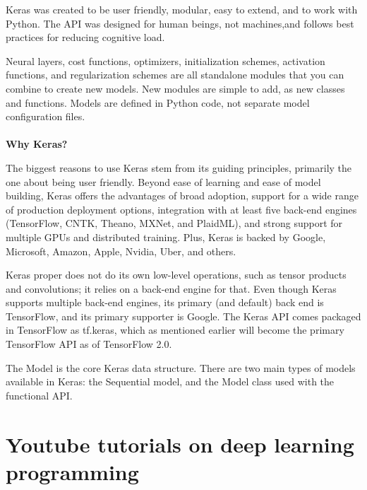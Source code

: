 \documentclass[11pt]{article}
\begin{document}
\begin{enumerate}
Keras was created to be user friendly, modular, easy to extend, and to work with Python. The API was \textquotesingle designed for human beings, not machines,\textquotesingle and \textquotesingle follows best practices for reducing cognitive load.\textquotesingle

Neural layers, cost functions, optimizers, initialization schemes, activation functions, and regularization schemes are all standalone modules that you can combine to create new models. New modules are simple to add, as new classes and functions. Models are defined in Python code, not separate model configuration files.\\\\
\textbf{Why Keras?}

The biggest reasons to use Keras stem from its guiding principles, primarily the one about being user friendly. Beyond ease of learning and ease of model building, Keras offers the advantages of broad adoption, support for a wide range of production deployment options, integration with at least five back-end engines (TensorFlow, CNTK, Theano, MXNet, and PlaidML), and strong support for multiple GPUs and distributed training. Plus, Keras is backed by Google, Microsoft, Amazon, Apple, Nvidia, Uber, and others.


Keras proper does not do its own low-level operations, such as tensor products and convolutions; it relies on a back-end engine for that. Even though Keras supports multiple back-end engines, its primary (and default) back end is TensorFlow, and its primary supporter is Google. The Keras API comes packaged in TensorFlow as tf.keras, which as mentioned earlier will become the primary TensorFlow API as of TensorFlow 2.0.


The Model is the core Keras data structure. There are two main types of models available in Keras: the Sequential model, and the Model class used with the functional API.
\end{enumerate}{}

   

 
\clearpage
\section{Youtube tutorials on deep learning programming}
\end{document}
